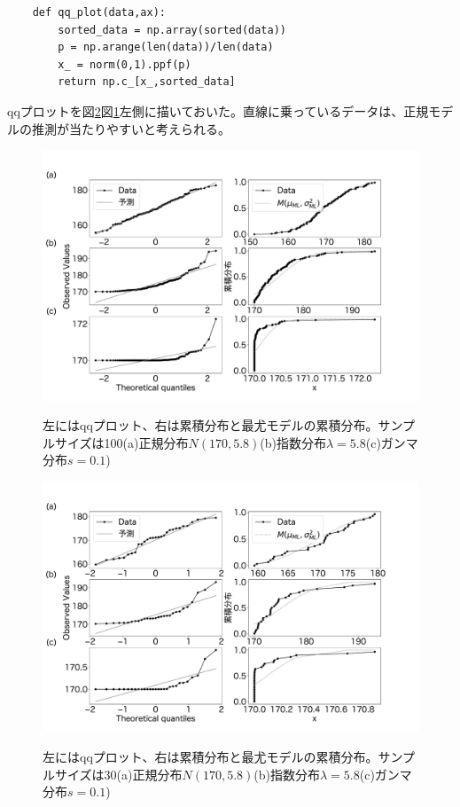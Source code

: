 \begin{lstlisting}
    def qq_plot(data,ax):
        sorted_data = np.array(sorted(data))
        p = np.arange(len(data))/len(data)
        x_ = norm(0,1).ppf(p)
        return np.c_[x_,sorted_data]
\end{lstlisting}


qqプロットを図\ref{fig:qq_cummlative_30}図\ref{fig:qq_cummlative}左側に描いておいた。直線に乗っているデータは、正規モデルの推測が当たりやすいと考えられる。

\begin{figure}
    \begin{center}
        \includegraphics[width=15cm]{./image/12_/qq_cummlative_expon_norm_gamma.pdf}
        \label{fig:qq_cummlative}
        \caption{左にはqqプロット、右は累積分布と最尤モデルの累積分布。サンプルサイズは100(a)正規分布$N(170,5.8)$(b)指数分布$\lambda=5.8$(c)ガンマ分布$s=0.1$)}
    \end{center}
\end{figure}

\begin{figure}
    \begin{center}
        \includegraphics[width=15cm]{./image/12_/qq_cummlative_expon_norm_gammaN_30.pdf}
        \label{fig:qq_cummlative_30}
        \caption{左にはqqプロット、右は累積分布と最尤モデルの累積分布。サンプルサイズは30(a)正規分布$N(170,5.8)$(b)指数分布$\lambda=5.8$(c)ガンマ分布$s=0.1$)}
    \end{center}
\end{figure}


